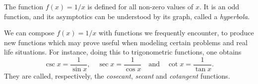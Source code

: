 \documentclass{ximera}
\begin{document}

\begin{summary}
\item The function $f(x) = 1/x$ is defined for all non-zero values of $x$. It is an odd function, and its asymptotics can be understood by its graph, called a \emph{hyperbola}.
\item We can compose $f(x) = 1/x$ with functions we frequently encounter, to produce new functions which may prove useful when modeling certain problems and real life situations. For instance, doing this to trigonometric functions, one obtains \[   \csc x = \frac{1}{\sin x}, \quad \sec x = \frac{1}{\cos x} \quad\mbox{and} \quad \cot x = \frac{1}{\tan x}.  \]They are called, respectively, the \emph{cosecant}, \emph{secant} and \emph{cotangent} functions.
\end{summary}
\end{document}

